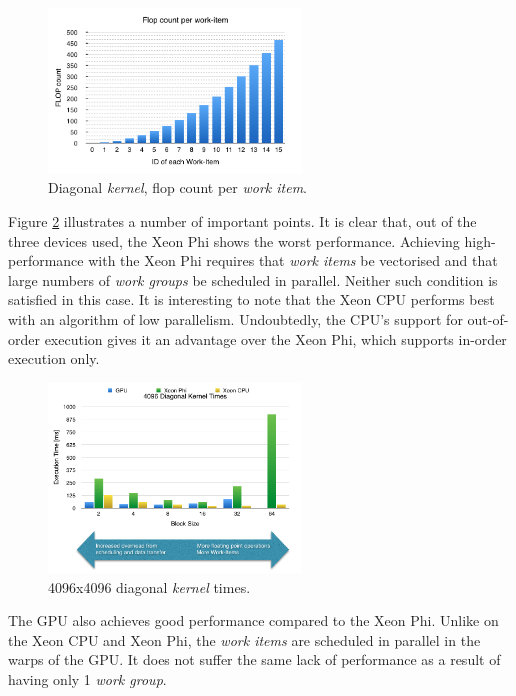 \begin{figure}[!h]
    \centering
    \includegraphics[width=0.6\textwidth]{figures/FlopCount.png}
    \caption{Diagonal \emph{kernel}, flop count per \emph{work item}.}
    \label{FlopCount}
\end{figure}

\par{Figure \ref{DiagonalKernel} illustrates a number of important points. 
    It is clear that, out of the three devices used, the Xeon Phi shows 
    the worst performance. Achieving high-performance with the Xeon Phi 
    requires that \emph{work items} be vectorised and that large numbers of 
    \emph{work groups} be scheduled in parallel. Neither such condition is satisfied 
    in this case. It is interesting to note that the Xeon CPU performs best 
    with an algorithm of low parallelism. Undoubtedly, the CPU’s support for 
    out-of-order execution gives it an advantage over the Xeon Phi, which 
    supports in-order execution only.}

\begin{figure}[!h]
    \centering
    \includegraphics[width=0.6\textwidth]{figures/DiagonalKernel.png}
    \caption{4096x4096 diagonal \emph{kernel} times.}
    \label{DiagonalKernel}
\end{figure}

\par{The GPU also achieves good performance compared to the Xeon Phi. 
    Unlike on the Xeon CPU and Xeon Phi, the \emph{work items} are scheduled in 
    parallel in the warps of the GPU. It does not suffer the same lack of 
    performance as a result of having only 1 \emph{work group}.}



